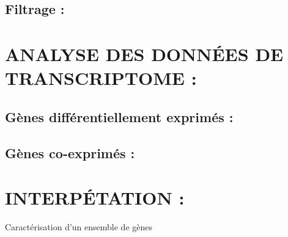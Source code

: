 \documentclass[a4paper,10pt]{article}
\begin{document}
\subsection{Filtrage :}

\section{ANALYSE DES DONN\'{E}ES DE TRANSCRIPTOME :}
\subsection{Gènes différentiellement exprimés :}
\subsection{Gènes co-exprimés :}

\section{INTERP\'{E}TATION :}
Caractérisation d’un ensemble de gènes
\begin{abstract}
\end{abstract}
\end{document}
